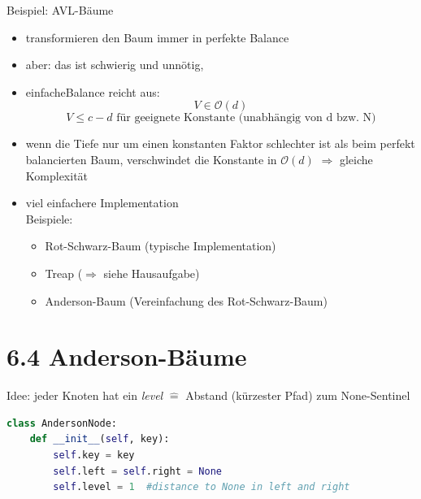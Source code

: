 \documentclass[11pt, fleqn]{scrreprt}
\begin{document}
Beispiel: AVL-Bäume
\begin{itemize}
	\item transformieren den Baum immer in perfekte Balance
	\item aber: das ist schwierig und unnötig,
\end{itemize}
\begin{itemize}[label={$\Rightarrow$}]
	\item \glqq einfache\grqq Balance reicht aus: \[ V \in \mathcal{O}(d)\]
	\[ V \leq c - d \text{ für geeignete Konstante (unabhängig von d bzw. N)}\]
	\item wenn die Tiefe nur um einen konstanten Faktor schlechter ist als beim perfekt balancierten Baum, verschwindet die Konstante in $\mathcal{O}(d)$ $\Rightarrow$ gleiche Komplexität
	\item viel einfachere Implementation \\
	Beispiele:
	\begin{itemize}
		\item Rot-Schwarz-Baum (typische Implementation)
		\item Treap ($\Rightarrow$ siehe Hausaufgabe)
		\item Anderson-Baum (Vereinfachung des Rot-Schwarz-Baum)
	\end{itemize}
\end{itemize}

\section*{6.4 Anderson-Bäume}
Idee: jeder Knoten hat ein \emph{level} $\widehat{=}$ Abstand (kürzester Pfad) zum None-Sentinel

\begin{lstlisting}[language=Python]
class AndersonNode:
	def __init__(self, key):
		self.key = key
		self.left = self.right = None
		self.level = 1 	#distance to None in left and right
\end{lstlisting}
\end{document}
